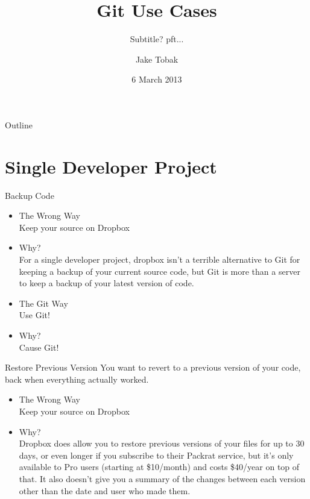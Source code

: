 \documentclass{beamer}
\title{Git Use Cases}
\subtitle{Subtitle? pft...}
\author{Jake Tobak}
\institute{Engineering and Computer Science Interest Group \\
           URI Student ACM Chapter}
\date{6 March 2013}
\begin{document}
\frame{\titlepage}

\begin{frame}{Outline}
  \tableofcontents
\end{frame}


\section{Single Developer Project}
\begin{frame}{Backup Code}
  \begin{itemize}
  \item The Wrong Way\\
          Keep your source on Dropbox
  \pause
  \item Why?\\
        For a single developer project, dropbox isn't a terrible alternative to Git for keeping a backup of your current source code, but Git is more than a server to keep a backup of your latest version of code.
  \pause
  \item The Git Way\\
        Use Git!
  \pause
  \item Why?\\
        Cause Git!
  
  \end{itemize}
  

\end{frame}

\begin{frame}{Restore Previous Version}
  You want to revert to a previous version of your code, back when everything actually worked.
  \begin{itemize}
  \item The Wrong Way\\
          Keep your source on Dropbox
  \pause
  \item Why?\\
        Dropbox does allow you to restore previous versions of your files for up to 30 days, or even longer if you subscribe to their Packrat service, but it's only available to Pro users (starting at \$10/month) and costs \$40/year on top of that. It also doesn't give you a summary of the changes between each version other than the date and user who made them.
        \end{itemize}
\end{frame}
\end{document}
